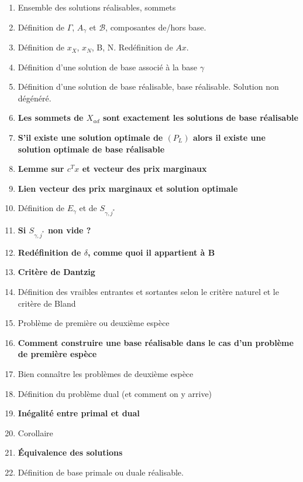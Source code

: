 \documentclass{article}
\begin{document}
\begin{enumerate}
\item Ensemble des solutions réalisables, sommets
\item Définition de $\Gamma$, $A_{\gamma}$ et $\mathcal{B}$, composantes de/hors base. 
\item Définition de $x_X$, $x_N$, B, N. Redéfinition de $Ax$. 
\item Définition d'une solution de base associé à la base $\gamma$
\item Définition d'une solution de base réalisable, base réalisable. Solution non dégénéré.
\item \textbf{Les sommets de $X_{ad}$ sont exactement les solutions de base réalisable}
\item \textbf{S'il existe une solution optimale de $(P_L)$ alors il existe une solution optimale de base réalisable}
\item \textbf{Lemme sur $c^Tx$ et vecteur des prix marginaux}
\item \textbf{Lien vecteur des prix marginaux et solution optimale}
\item Définition de $E_{\gamma}$ et de $S_{\gamma, j^*}$
\item \textbf{Si $S_{\gamma, j^*}$ non vide ?}
\item \textbf{Redéfinition de $\delta$, comme quoi il appartient à B}
\item \textbf{Critère de Dantzig}
\item Définition des vraibles entrantes et sortantes selon le critère naturel et le critère de Bland
\item Problème de première ou deuxième espèce
\item \textbf{Comment construire une base réalisable dans le cas d'un problème de première espèce}
\item Bien connaître les problèmes de deuxième espèce
\item Définition du problème dual (et comment on y arrive)
\item \textbf{Inégalité entre primal et dual}
\item Corollaire
\item \textbf{Équivalence des solutions}
\item Définition de base primale ou duale réalisable.
\end{enumerate}
\end{document}
